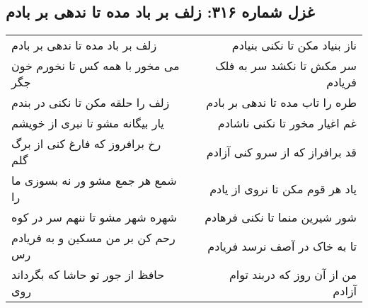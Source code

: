 \begin{center}
\section*{غزل شماره ۳۱۶: زلف بر باد مده تا ندهی بر بادم}
\label{sec:sh316}
\begin{longtable}{l p{0.5cm} r}
زلف بر باد مده تا ندهی بر بادم
&&
ناز بنیاد مکن تا نکنی بنیادم
\\
می مخور با همه کس تا نخورم خون جگر
&&
سر مکش تا نکشد سر به فلک فریادم
\\
زلف را حلقه مکن تا نکنی در بندم
&&
طره را تاب مده تا ندهی بر بادم
\\
یار بیگانه مشو تا نبری از خویشم
&&
غم اغیار مخور تا نکنی ناشادم
\\
رخ برافروز که فارغ کنی از برگ گلم
&&
قد برافراز که از سرو کنی آزادم
\\
شمع هر جمع مشو ور نه بسوزی ما را
&&
یاد هر قوم مکن تا نروی از یادم
\\
شهره شهر مشو تا ننهم سر در کوه
&&
شور شیرین منما تا نکنی فرهادم
\\
رحم کن بر من مسکین و به فریادم رس
&&
تا به خاک در آصف نرسد فریادم
\\
حافظ از جور تو حاشا که بگرداند روی
&&
من از آن روز که دربند توام آزادم
\\
\end{longtable}
\end{center}
